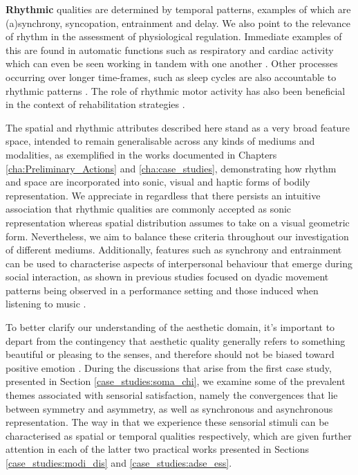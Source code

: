 \textbf{Rhythmic} qualities are determined by temporal patterns, examples of which are (a)synchrony, syncopation, entrainment and delay. We also point to the relevance of rhythm in the assessment of physiological regulation. Immediate examples of this are found in automatic functions such as respiratory and cardiac activity \cite{moser_phase_1995} which can even be seen working in tandem with one another \cite{scholkmann_pulse-respiration_2019}. Other processes occurring over longer time-frames, such as sleep cycles are also accountable to rhythmic patterns \cite{moser_why_2006}. The role of rhythmic motor activity has also been beneficial in the context of rehabilitation strategies \cite{fujii_role_2014}.

The spatial and rhythmic attributes described here stand as a very broad feature space, intended to remain generalisable across any kinds of mediums and modalities, as exemplified in the works documented in Chapters \ref{cha:Preliminary_Actions} and \ref{cha:case_studies}, demonstrating how rhythm and space are incorporated into sonic, visual and haptic forms of bodily representation. We appreciate in regardless that there persists an intuitive association that rhythmic qualities are commonly accepted as sonic representation whereas spatial distribution assumes to take on a visual geometric form. Nevertheless, we aim to balance these criteria throughout our investigation of different mediums. Additionally, features such as synchrony and entrainment can be used to characterise aspects of interpersonal behaviour that emerge during social interaction, as shown in previous studies focused on dyadic movement patterns being observed in a performance setting \cite{ward_sensing_2018} and those induced when listening to music \cite{scurto_entrain_2019,danielsen_moving_2015}.

To better clarify our understanding of the aesthetic domain, it’s important to depart from the contingency that aesthetic quality generally refers to something beautiful or pleasing to the senses, and therefore should not be biased toward positive emotion \cite{fingerhut_aesthetic_2020}. During the discussions that arise from the first case study, presented in Section \ref{case_studies:soma_chi}, we examine some of the prevalent themes associated with sensorial satisfaction, namely the convergences that lie between symmetry and asymmetry, as well as synchronous and asynchronous representation. The way in that we experience these sensorial stimuli can be characterised as spatial or temporal qualities respectively, which are given further attention in each of the latter two practical works presented in Sections \ref{case_studies:modi_dis} and \ref{case_studies:adse_ess}.
